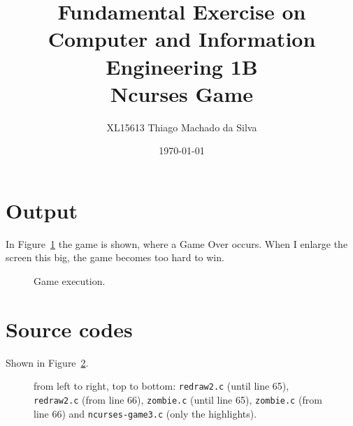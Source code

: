 \documentclass{article}
\title{Fundamental Exercise on Computer and Information Engineering 1B \\ Ncurses Game}
\author{XL15613   Thiago Machado da Silva}
\date{\today}
\begin{document}
\maketitle

\section*{Output}
In Figure~\ref{fig:output} the game is shown, where a Game Over occurs. When I enlarge the screen this big, the game becomes too hard to win. \\

\begin{figure}[htbp]
  \centering
  \caption{Game execution.}
  \label{fig:output}
\end{figure}

\section*{Source codes}
Shown in Figure~\ref{fig:src1}.

\begin{figure}[h]
  \centering
  \caption{from left to right, top to bottom: {\tt redraw2.c} (until line 65), {\tt redraw2.c} (from line 66), {\tt zombie.c} (until line 65), {\tt zombie.c} (from line 66) and {\tt ncurses-game3.c} (only the highlights).}
  \label{fig:src1}
\end{figure}
\end{document}
